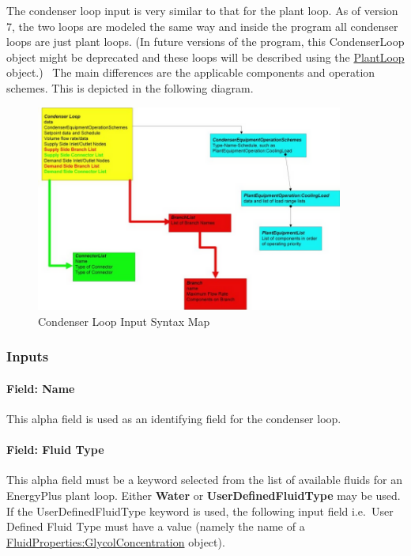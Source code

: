 The condenser loop input is very similar to that for the plant loop. As of version 7, the two loops are modeled the same way and inside the program all condenser loops are just plant loops. (In future versions of the program, this CondenserLoop object might be deprecated and these loops will be described using the \hyperref[plantloop]{PlantLoop} object.)~ The main differences are the applicable components and operation schemes. This is depicted in the following diagram.

\begin{figure}[hbtp] %
\centering
\includegraphics[width=0.9\textwidth, height=0.9\textheight, keepaspectratio=true]{media/image136.png}
\caption{Condenser Loop Input Syntax Map \protect \label{fig:condenser-loop-input-syntax-map}}
\end{figure}

\subsubsection{Inputs}\label{inputs-1-032}

\paragraph{Field: Name}\label{field-name-1-031}

This alpha field is used as an identifying field for the condenser loop.

\paragraph{Field: Fluid Type}\label{field-fluid-type-1-000}

This alpha field must be a keyword selected from the list of available fluids for an EnergyPlus plant loop. Either \textbf{Water} or \textbf{UserDefinedFluidType} may be used. If the UserDefinedFluidType keyword is used, the following input field i.e.~User Defined Fluid Type must have a value (namely the name of a \hyperref[fluidpropertiesglycolconcentration]{FluidProperties:GlycolConcentration} object).

